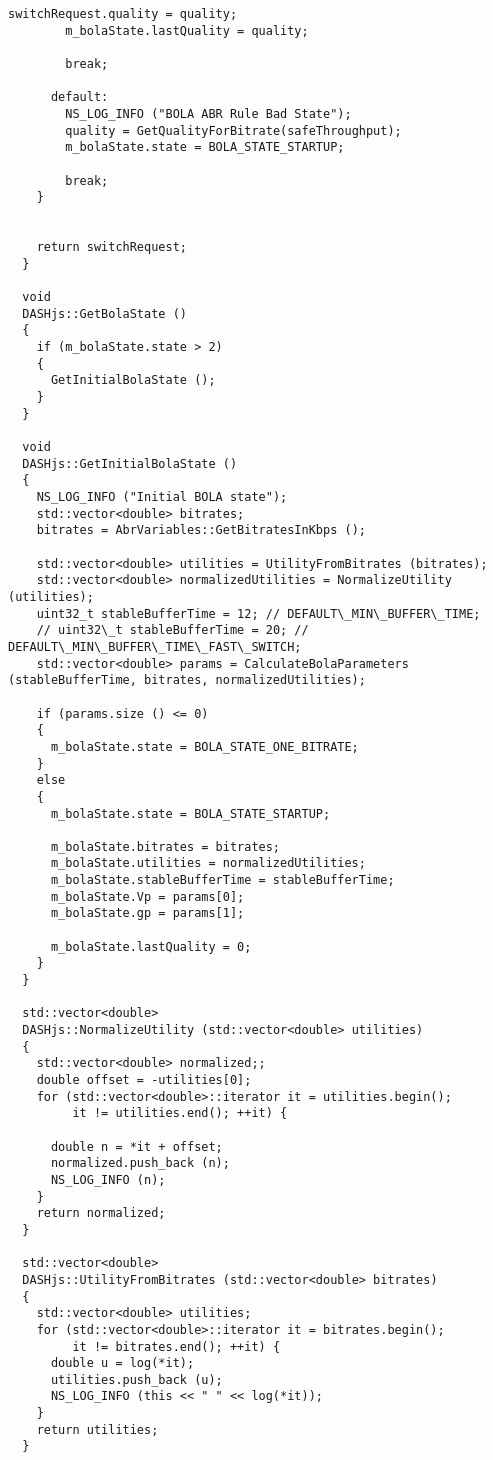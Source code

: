 \begin{lstlisting}[language=myC++, caption={DASHjs.cc}, captionpos=b]
        switchRequest.quality = quality;
        m_bolaState.lastQuality = quality;
  
        break;
  
      default:
        NS_LOG_INFO ("BOLA ABR Rule Bad State");
        quality = GetQualityForBitrate(safeThroughput);
        m_bolaState.state = BOLA_STATE_STARTUP;
  
        break;
    }
  
  
    return switchRequest;
  }
  
  void
  DASHjs::GetBolaState ()
  {
    if (m_bolaState.state > 2)
    {
      GetInitialBolaState ();
    }
  }
  
  void
  DASHjs::GetInitialBolaState ()
  {
    NS_LOG_INFO ("Initial BOLA state");
    std::vector<double> bitrates;
    bitrates = AbrVariables::GetBitratesInKbps ();
  
    std::vector<double> utilities = UtilityFromBitrates (bitrates);
    std::vector<double> normalizedUtilities = NormalizeUtility (utilities);
    uint32_t stableBufferTime = 12; // DEFAULT\_MIN\_BUFFER\_TIME;
    // uint32\_t stableBufferTime = 20; // DEFAULT\_MIN\_BUFFER\_TIME\_FAST\_SWITCH;
    std::vector<double> params = CalculateBolaParameters (stableBufferTime, bitrates, normalizedUtilities);
  
    if (params.size () <= 0)
    {
      m_bolaState.state = BOLA_STATE_ONE_BITRATE;
    }
    else
    {
      m_bolaState.state = BOLA_STATE_STARTUP;
  
      m_bolaState.bitrates = bitrates;
      m_bolaState.utilities = normalizedUtilities;
      m_bolaState.stableBufferTime = stableBufferTime;
      m_bolaState.Vp = params[0];
      m_bolaState.gp = params[1];
  
      m_bolaState.lastQuality = 0;
    }
  }
  
  std::vector<double>
  DASHjs::NormalizeUtility (std::vector<double> utilities)
  {
    std::vector<double> normalized;;
    double offset = -utilities[0];
    for (std::vector<double>::iterator it = utilities.begin();
         it != utilities.end(); ++it) {
  
      double n = *it + offset;
      normalized.push_back (n);
      NS_LOG_INFO (n);
    }
    return normalized;
  }
  
  std::vector<double>
  DASHjs::UtilityFromBitrates (std::vector<double> bitrates)
  {
    std::vector<double> utilities;
    for (std::vector<double>::iterator it = bitrates.begin();
         it != bitrates.end(); ++it) {
      double u = log(*it);
      utilities.push_back (u);
      NS_LOG_INFO (this << " " << log(*it));
    }
    return utilities;
  }
  

\end{lstlisting}
